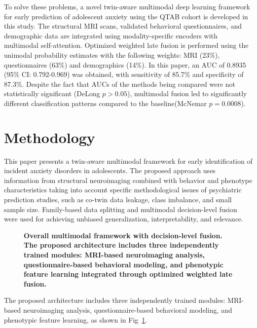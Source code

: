 \documentclass[10pt,letterpaper]{article}
\begin{document}
To solve these problems, a novel twin-aware multimodal deep learning framework for early prediction of adolescent anxiety using the QTAB cohort is developed in this study. The structural MRI scans, validated behavioral questionnaires, and demographic data are integrated using modality-specific encoders with multimodal self-attention. Optimized weighted late fusion is performed using the unimodal probability estimates with the following weights: MRI (23\%), questionnaires (63\%) and demographics (14\%). In this paper, an AUC of 0.8935 (95\% CI: 0.792-0.969) was obtained, with sensitivity of 85.7\% and specificity of 87.3\%. Despite the fact that AUCs of the methods being compared were not statistically significant (DeLong $p> 0.05$), multimodal fusion led to significantly different classification patterns compared to the baseline(McNemar $p=0.0008$).



        \section*{Methodology}

       This paper presents a twin-aware multimodal framework for early identification of incident anxiety disorders in adolescents. The proposed approach uses information from structural neuroimaging combined with behavior and phenotype characteristics taking into account specific methodological issues of psychiatric prediction studies, such as co-twin data leakage, class imbalance, and small sample size. Family-based data splitting and multimodal decision-level fusion were used for achieving unbiased generalization, interpretability, and relevance.

        \begin{figure}[!ht]
        \caption{\textbf{Overall multimodal framework with decision-level fusion.
        The proposed architecture includes three independently trained modules: MRI-based neuroimaging analysis, questionnaire-based behavioral modeling, and phenotypic feature learning integrated through optimized weighted late fusion.}}
        \label{fig:main}
        \end{figure}

        The proposed architecture includes three independently trained modules: MRI-based neuroimaging analysis, questionnaire-based behavioral modeling, and phenotypic feature learning, as shown in Fig~\ref{fig:main}.
\end{document}
